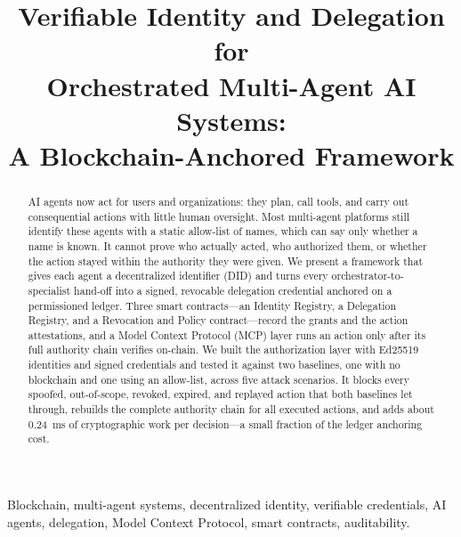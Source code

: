\documentclass[conference]{IEEEtran}
\begin{document}
\title{Verifiable Identity and Delegation for\\Orchestrated Multi-Agent AI Systems:\\A Blockchain-Anchored Framework}

\author{%
}

\maketitle

\begin{abstract}
AI agents now act for users and organizations: they plan, call tools, and carry out consequential actions with little human oversight. Most multi-agent platforms still identify these agents with a static allow-list of names, which can say only whether a name is known. It cannot prove who actually acted, who authorized them, or whether the action stayed within the authority they were given. We present a framework that gives each agent a decentralized identifier (DID) and turns every orchestrator-to-specialist hand-off into a signed, revocable delegation credential anchored on a permissioned ledger. Three smart contracts---an Identity Registry, a Delegation Registry, and a Revocation and Policy contract---record the grants and the action attestations, and a Model Context Protocol (MCP) layer runs an action only after its full authority chain verifies on-chain. We built the authorization layer with Ed25519 identities and signed credentials and tested it against two baselines, one with no blockchain and one using an allow-list, across five attack scenarios. It blocks every spoofed, out-of-scope, revoked, expired, and replayed action that both baselines let through, rebuilds the complete authority chain for all executed actions, and adds about 0.24~ms of cryptographic work per decision---a small fraction of the ledger anchoring cost.
\end{abstract}

\begin{IEEEkeywords}
Blockchain, multi-agent systems, decentralized identity, verifiable credentials, AI agents, delegation, Model Context Protocol, smart contracts, auditability.
\end{IEEEkeywords}
\end{document}
